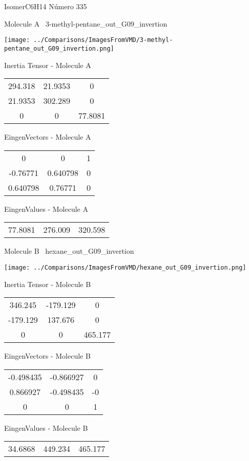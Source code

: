 \vtab[-3cm]
\begin{center}
{\large IsomerC6H14 \tab Número 335}
\end{center}
\begin{multicols}{2}
\begin{center}

Molecule A \
3-methyl-pentane\_out\_G09\_invertion

\texttt{[image: ../Comparisons/ImagesFromVMD/3-methyl-pentane\_out\_G09\_invertion.png]}

Inertia Tensor - Molecule A \\
\begin{tabular}{|c c c|}
294.318	 & 	21.9353	 & 	0	 \\
21.9353	 & 	302.289	 & 	0	 \\
0	 & 	0	 & 	77.8081
\end{tabular}

\vtab
 EingenVectors - Molecule A     \\
\begin{tabular}{|c c c|}
0	 & 	0	 & 	1	 \\
-0.76771	 & 	0.640798	 & 	0	 \\
0.640798	 & 	0.76771	 & 	0
\end{tabular}

\vtab
 EingenValues - Molecule A     \\
\begin{tabular}{|c c c|}
77.8081	 & 	276.009	 & 	320.598	 \\
\end{tabular}
\columnbreak

Molecule B \
hexane\_out\_G09\_invertion

\texttt{[image: ../Comparisons/ImagesFromVMD/hexane\_out\_G09\_invertion.png]}

Inertia Tensor - Molecule B \\
\begin{tabular}{|c c c|}
346.245	 & 	-179.129	 & 	0	 \\
-179.129	 & 	137.676	 & 	0	 \\
0	 & 	0	 & 	465.177
\end{tabular}

\vtab
 EingenVectors - Molecule B     \\
\begin{tabular}{|c c c|}
-0.498435	 & 	-0.866927	 & 	0	 \\
0.866927	 & 	-0.498435	 & 	-0	 \\
0	 & 	0	 & 	1
\end{tabular}

\vtab
 EingenValues - Molecule B     \\
\begin{tabular}{|c c c|}
34.6868	 & 	449.234	 & 	465.177	 \\
\end{tabular}

\end{center}
\end{multicols}

